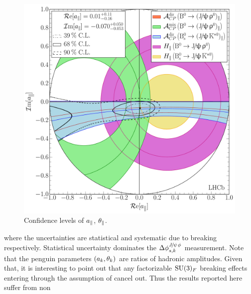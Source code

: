 \begin{figure}[t!]
\centering
  \includegraphics[trim=0.0cm 0.0cm 0.0cm 0.0cm, clip=true,scale=0.39]{Figures/Chapter5/Penguin_Contribution_Re_vs_Im_allB2VV_Para_withH.pdf}
  \caption{Confidence levels of $a_{\parallel}$, $\theta_{\parallel}$.}
  \label{pengPlot_para}
\end{figure}

\noindent where the uncertainties are statistical and systematic due to \grpsuthree breaking respectively.
Statistical uncertainty dominates the $\Delta\phi^{{J\mskip -3mu/\mskip -2mu\psi\mskip 2mu}\phi}_{s,{k}}$ measurement.
Note that the penguin parameters $(a_k,\theta_k)$ are ratios of hadronic amplitudes.
Given that, it is interesting to point out that any factorizable $\mathrm{SU}(3)_F$ breaking
effects entering through the assumption of  cancel out. Thus the results
reported here suffer from non

